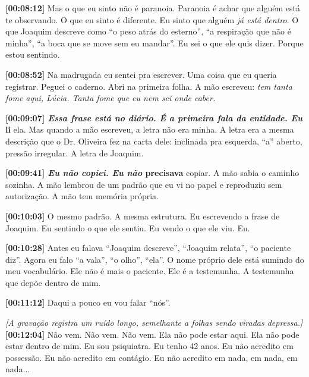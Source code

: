 \noindent \textbf{[00:08:12]} Mas o que eu sinto não é paranoia. Paranoia é achar que alguém está te observando. O que eu sinto é diferente. Eu sinto que alguém \textit{já está dentro}. O que Joaquim descreve como \textquotedblleft{}o peso atrás do esterno\textquotedblright{}, \textquotedblleft{}a respiração que não é minha\textquotedblright{}, \textquotedblleft{}a boca que se move sem eu mandar\textquotedblright{}. Eu sei o que ele quis dizer. Porque estou sentindo.

\noindent \textbf{[00:08:52]} Na madrugada eu sentei pra escrever. Uma coisa que eu queria registrar. Peguei o caderno. Abri na primeira folha. A mão escreveu: \textit{tem tanta fome aqui, Lúcia. Tanta fome que eu nem sei onde caber.}

\noindent \textbf{[00:09:07]\textit{ Essa frase está no diário. É a primeira fala da entidade. Eu }li} ela. Mas quando a mão escreveu, a letra não era minha. A letra era a mesma descrição que o Dr. Oliveira fez na carta dele: inclinada pra esquerda, \textquotedblleft{}a\textquotedblright{} aberto, pressão irregular. A letra de Joaquim.

\noindent \textbf{[00:09:41]\textit{ Eu não copiei. Eu não }precisava} copiar. A mão sabia o caminho sozinha. A mão lembrou de um padrão que eu vi no papel e reproduziu sem autorização. A mão tem memória própria.

\noindent \textbf{[00:10:03]} O mesmo padrão. A mesma estrutura. Eu escrevendo a frase de Joaquim. Eu sentindo o que ele sentiu. Eu vendo o que ele viu. Eu.

\noindent \textbf{[00:10:28]} Antes eu falava \textquotedblleft{}Joaquim descreve\textquotedblright{}, \textquotedblleft{}Joaquim relata\textquotedblright{}, \textquotedblleft{}o paciente diz\textquotedblright{}. Agora eu falo \textquotedblleft{}a vala\textquotedblright{}, \textquotedblleft{}o olho\textquotedblright{}, \textquotedblleft{}ela\textquotedblright{}. O nome próprio dele está sumindo do meu vocabulário. Ele não é mais o paciente. Ele é a testemunha. A testemunha que depõe dentro de mim.

\noindent \textbf{[00:11:12]} Daqui a pouco eu vou falar \textquotedblleft{}nós\textquotedblright{}.

\noindent \textit{[A gravação registra um ruído longo, semelhante a folhas sendo viradas depressa.]}
\noindent \textbf{[00:12:04]} Não vem. Não vem. Não vem. Ela não pode estar aqui. Ela não pode estar dentro de mim. Eu sou psiquiatra. Eu tenho 42 anos. Eu não acredito em possessão. Eu não acredito em contágio. Eu não acredito em nada, em nada, em nada...

